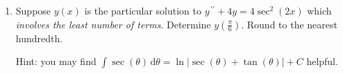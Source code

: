 \documentclass{ximera}
\begin{document}
\begin{enumerate}[label=(\arabic*)]




\begin{enumerate}[label=(\alph*)]
\item $v=t$
\item $v=-0.5e^{2t}$
\item $v=-e^{-t}$
\item $v=(t-1)e^t$
\item $v=-(t-1)e^t$ %
\item $v=-e^t$
\end{enumerate}




\item Suppose $y(x)$ is the particular solution to $y^{\,\prime\prime}+4y=4\sec^2(2x)$ which \emph{involves the least number of terms}.  Determine $\displaystyle y\left(\frac{\pi}{6}\right)$.  Round to the nearest hundredth.



Hint: you may find $\displaystyle \int \sec (\theta)\, \mathrm{d}\theta=\ln \left|\sec (\theta)+\tan (\theta)\right|+C$ helpful.



\end{enumerate}
\end{document}
